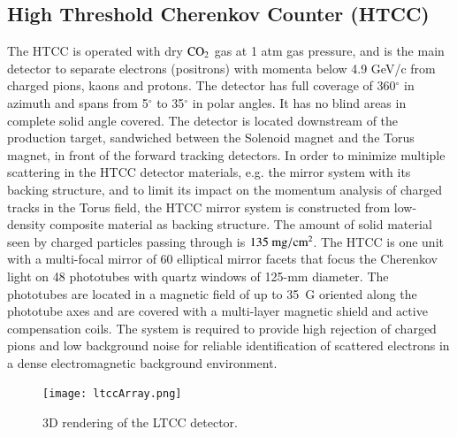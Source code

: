 \documentclass[final,3p,times,twocolumn,authoryear]{elsarticle}
\begin{document}
\subsection{\rm High Threshold Cherenkov Counter (HTCC)}
\label{}
The HTCC is operated with dry $\rm CO_2$ gas at 1 atm gas pressure, and is the main detector to 
separate electrons (positrons) with momenta below 4.9 GeV/c from charged pions, kaons and protons. 
The detector has full coverage of 360$^\circ$ in azimuth and spans from 5$^\circ$ to 35$^\circ$ in polar angles.
It has no blind areas in complete solid angle covered. The detector is located downstream of the production target, 
sandwiched between the Solenoid magnet and the Torus magnet, in front of the forward tracking detectors. 
In order to minimize multiple scattering in the HTCC detector materials, e.g. the mirror system with its 
backing structure, and to limit its impact on the momentum analysis of charged tracks in the Torus field,
the HTCC mirror system is constructed from low-density composite material as backing structure. 
The amount of solid material seen by charged particles passing through is $135~\rm{mg/cm^2}$. 
The HTCC is one unit with a 
multi-focal mirror of 60 elliptical mirror facets that focus the Cherenkov light on 48  
phototubes with quartz windows of 125-mm diameter. The phototubes are located in a magnetic field 
of up to 35~G oriented along 
the phototube axes and are covered with a multi-layer magnetic shield and active compensation coils. 
The system 
is required to provide high rejection of charged pions and low background noise for reliable 
identification of scattered electrons in a dense electromagnetic background environment. 
\begin{figure}[htbp!]
\centerline{\texttt{[image: ltccArray.png]}}
\caption{3D rendering of the LTCC detector.}
\label{ltcc}
\end{figure}
\end{document}

